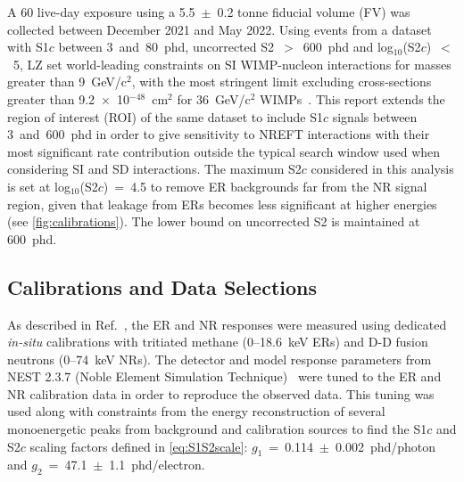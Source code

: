 \documentclass[reprint, showpacs,
preprintnumbers,
amsmath,amssymb,
aps, floatfix,
superscriptaddress,
prd, nofootinbib]{revtex4-1}
\begin{document}
A 60 live-day exposure using a 5.5~$\pm$~0.2 tonne fiducial volume (FV) was collected between December 2021 and May 2022. 
Using events from a dataset with S1$c$ between 3~and~80~phd, uncorrected S2~$>$~600~phd and log$_{10}$(S2$c$)~$<$~5, LZ set world-leading constraints on SI WIMP-nucleon interactions for masses greater than 9~GeV/c$^2$, 
with the most stringent limit excluding cross-sections greater than 9.2~$\times$~10$^{-48}$~cm$^2$ for 36~GeV/c$^2$ WIMPs~\cite{LZ:SR1WS_2022}. 
This report extends the region of interest (ROI) of the same dataset to include S1$c$ signals between 3~and~600~phd in order to give sensitivity to NREFT interactions with their most significant rate contribution outside the typical search window used when considering SI and SD interactions. 
The maximum S2$c$ considered in this analysis is set at log$_{10}$(S2$c$)~=~4.5 to remove ER backgrounds far from the NR signal region, given that leakage from ERs becomes less significant at higher energies (see \autoref{fig:calibrations}).
The lower bound on uncorrected S2 is maintained at 600~phd.

\subsection{\label{subsec:cal_and_data}Calibrations and Data Selections}
\par
As described in Ref.~\cite{LZ:SR1WS_2022}, the ER and NR responses were measured using dedicated \textit{in-situ} calibrations with tritiated methane (0--18.6~keV ERs) and D-D fusion neutrons (0--74~keV NRs). 
The detector and model response parameters from NEST 2.3.7 (Noble Element Simulation Technique)~\cite{NEST:paper_2022, NEST:paper_2023} were tuned to the ER and NR calibration data in order to reproduce the observed data. 
This tuning was used along with constraints from the energy reconstruction of several monoenergetic peaks from background and calibration sources to find the S1$c$ and S2$c$ scaling factors defined in \autoref{eq:S1S2scale}: $g_1$~=~0.114~$\pm$~0.002~phd/photon and $g_2$~=~47.1~$\pm$~1.1~phd/electron. 
\end{document}
